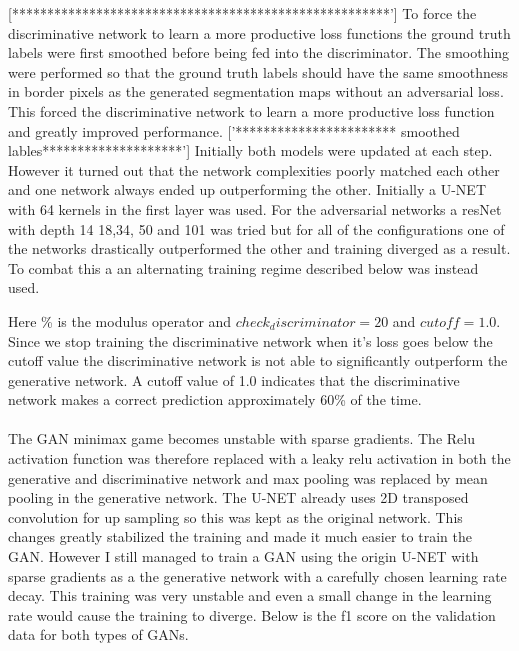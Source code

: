 \documentclass[a4paper,11pt]{article}
\begin{document}
[******************************************************']
To force the discriminative network to learn a more productive loss functions the ground truth labels were first smoothed before being fed into the discriminator. The smoothing were performed so that the ground truth labels should have the same smoothness in border pixels as the generated segmentation maps without an adversarial loss. This forced the discriminative network to learn a more productive loss function and greatly improved performance.
['*********************** smoothed lables********************']
Initially both models were updated at each step. However it turned out that the network complexities poorly matched each other and one network always ended up outperforming the other. Initially a U-NET with 64 kernels in the first layer was used. For the adversarial networks a resNet with depth 14 18,34, 50 and 101 was tried but for all of the configurations one of the networks drastically outperformed the other and training diverged as a result. To combat this a an alternating training regime described below was instead used.

Here \% is the modulus operator and $check_discriminator=20$ and $cutoff=1.0$. Since we stop training the discriminative network when it's loss goes below the cutoff value the discriminative network is not able to significantly outperform the generative network. A cutoff value of 1.0 indicates that the discriminative network makes a correct prediction approximately 60\% of the time.\\
\\
The GAN minimax game becomes unstable with sparse gradients. The Relu activation function was therefore replaced with a leaky relu activation in both the generative and discriminative network and max pooling was replaced by mean pooling in the generative network. The U-NET already uses 2D transposed convolution for up sampling so this was kept as the original network. This changes greatly stabilized the training and made it much easier to train the GAN. However I still managed to train a GAN using the origin U-NET with sparse gradients as a the generative network with a carefully chosen learning rate decay. This training was very unstable and even a small change in the learning rate would cause the training to diverge. Below is the f1 score on the validation data for both types of GANs.
\end{document}
